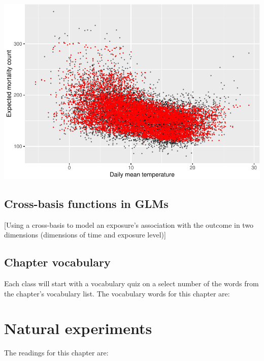 \documentclass[
]{book}
\begin{document}
\includegraphics{adv_epi_analysis_files/figure-latex/unnamed-chunk-58-1.pdf}

\hypertarget{cross-basis-functions-in-glms}{%
\section{Cross-basis functions in GLMs}\label{cross-basis-functions-in-glms}}

{[}Using a cross-basis to model an exposure's association with the
outcome in two dimensions (dimensions of time and exposure level){]}

\hypertarget{chapter-vocabulary-1}{%
\section{Chapter vocabulary}\label{chapter-vocabulary-1}}

Each class will start with a vocabulary quiz on a select number of the words
from the chapter's vocabulary list. The vocabulary words for this chapter are:

\hypertarget{natural-experiments}{%
\chapter{Natural experiments}\label{natural-experiments}}

The readings for this chapter are:
\end{document}
